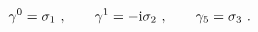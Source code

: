 \begin{equation}
\gamma^0 = \sigma_1 \ , \qquad \gamma^1 = - {\rm i} \sigma_2 \ , \qquad \gamma_5 = \sigma_3 \ .
\label{eq2p}
\end{equation}

